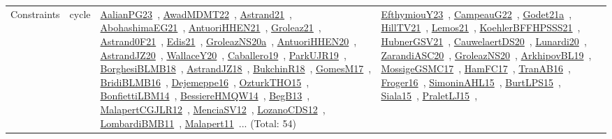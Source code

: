 {\begin{longtable}{lp{3cm}>{\raggedright\arraybackslash}p{6cm}>{\raggedright\arraybackslash}p{6cm}>{\raggedright\arraybackslash}p{8cm}}
Constraints & cycle & \href{../works/AalianPG23.pdf}{AalianPG23}~\cite{AalianPG23}, \href{../works/AwadMDMT22.pdf}{AwadMDMT22}~\cite{AwadMDMT22}, \href{../works/Astrand21.pdf}{Astrand21}~\cite{Astrand21}, \href{../works/AbohashimaEG21.pdf}{AbohashimaEG21}~\cite{AbohashimaEG21}, \href{../works/AntuoriHHEN21.pdf}{AntuoriHHEN21}~\cite{AntuoriHHEN21}, \href{../works/Groleaz21.pdf}{Groleaz21}~\cite{Groleaz21}, \href{../works/Astrand0F21.pdf}{Astrand0F21}~\cite{Astrand0F21}, \href{../works/Edis21.pdf}{Edis21}~\cite{Edis21}, \href{../works/GroleazNS20a.pdf}{GroleazNS20a}~\cite{GroleazNS20a}, \href{../works/AntuoriHHEN20.pdf}{AntuoriHHEN20}~\cite{AntuoriHHEN20}, \href{../works/AstrandJZ20.pdf}{AstrandJZ20}~\cite{AstrandJZ20}, \href{../works/WallaceY20.pdf}{WallaceY20}~\cite{WallaceY20}, \href{../works/Caballero19.pdf}{Caballero19}~\cite{Caballero19}, \href{../works/ParkUJR19.pdf}{ParkUJR19}~\cite{ParkUJR19}, \href{../works/BorghesiBLMB18.pdf}{BorghesiBLMB18}~\cite{BorghesiBLMB18}, \href{../works/AstrandJZ18.pdf}{AstrandJZ18}~\cite{AstrandJZ18}, \href{../works/BukchinR18.pdf}{BukchinR18}~\cite{BukchinR18}, \href{../works/GomesM17.pdf}{GomesM17}~\cite{GomesM17}, \href{../works/BridiBLMB16.pdf}{BridiBLMB16}~\cite{BridiBLMB16}, \href{../works/Dejemeppe16.pdf}{Dejemeppe16}~\cite{Dejemeppe16}, \href{../works/OzturkTHO15.pdf}{OzturkTHO15}~\cite{OzturkTHO15}, \href{../works/BonfiettiLBM14.pdf}{BonfiettiLBM14}~\cite{BonfiettiLBM14}, \href{../works/BessiereHMQW14.pdf}{BessiereHMQW14}~\cite{BessiereHMQW14}, \href{../works/BegB13.pdf}{BegB13}~\cite{BegB13}, \href{../works/MalapertCGJLR12.pdf}{MalapertCGJLR12}~\cite{MalapertCGJLR12}, \href{../works/MenciaSV12.pdf}{MenciaSV12}~\cite{MenciaSV12}, \href{../works/LozanoCDS12.pdf}{LozanoCDS12}~\cite{LozanoCDS12}, \href{../works/LombardiBMB11.pdf}{LombardiBMB11}~\cite{LombardiBMB11}, \href{../works/Malapert11.pdf}{Malapert11}~\cite{Malapert11}... (Total: 54) & \href{../works/EfthymiouY23.pdf}{EfthymiouY23}~\cite{EfthymiouY23}, \href{../works/CampeauG22.pdf}{CampeauG22}~\cite{CampeauG22}, \href{../works/Godet21a.pdf}{Godet21a}~\cite{Godet21a}, \href{../works/HillTV21.pdf}{HillTV21}~\cite{HillTV21}, \href{../works/Lemos21.pdf}{Lemos21}~\cite{Lemos21}, \href{../works/KoehlerBFFHPSSS21.pdf}{KoehlerBFFHPSSS21}~\cite{KoehlerBFFHPSSS21}, \href{../works/HubnerGSV21.pdf}{HubnerGSV21}~\cite{HubnerGSV21}, \href{../works/CauwelaertDS20.pdf}{CauwelaertDS20}~\cite{CauwelaertDS20}, \href{../works/Lunardi20.pdf}{Lunardi20}~\cite{Lunardi20}, \href{../works/ZarandiASC20.pdf}{ZarandiASC20}~\cite{ZarandiASC20}, \href{../works/GroleazNS20.pdf}{GroleazNS20}~\cite{GroleazNS20}, \href{../works/ArkhipovBL19.pdf}{ArkhipovBL19}~\cite{ArkhipovBL19}, \href{../works/MossigeGSMC17.pdf}{MossigeGSMC17}~\cite{MossigeGSMC17}, \href{../works/HamFC17.pdf}{HamFC17}~\cite{HamFC17}, \href{../works/TranAB16.pdf}{TranAB16}~\cite{TranAB16}, \href{../works/Froger16.pdf}{Froger16}~\cite{Froger16}, \href{../works/SimoninAHL15.pdf}{SimoninAHL15}~\cite{SimoninAHL15}, \href{../works/BurtLPS15.pdf}{BurtLPS15}~\cite{BurtLPS15}, \href{../works/Siala15.pdf}{Siala15}~\cite{Siala15}, \href{../works/PraletLJ15.pdf}{PraletLJ15}~\cite{PraletLJ15}, 
\end{longtable}}
